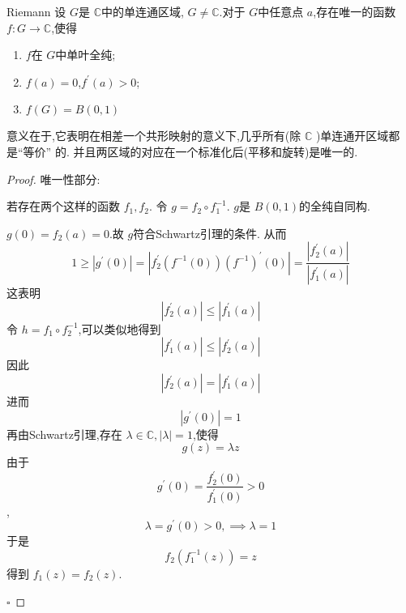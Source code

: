 \documentclass[../../复变函数.tex]{subfiles}
\begin{document}
\begin{theorem}{Riemann}
    设 \(  G  \)是 \(  \mathbb{C}   \)中的单连通区域, \(  G \neq \mathbb{C}   \).对于 \(  G  \)中任意点 \(  a  \),存在唯一的函数 \(  f:G\to \mathbb{C}   \),使得\begin{enumerate}
        \item \(  f  \)在 \(  G  \)中单叶全纯;
        \item  \(  f\left( a \right)= 0   \),\(  f^{\prime} \left( a \right)> 0   \);
        \item \(  f\left( G \right)= B\left( 0,1 \right)    \)     
    \end{enumerate}
          
\end{theorem}
\begin{note}
    意义在于,它表明在相差一个共形映射的意义下,几乎所有(除 \(  \mathbb{C}   \) )单连通开区域都是“等价” 的. 并且两区域的对应在一个标准化后(平移和旋转)是唯一的.
\end{note}
\begin{proof}
    唯一性部分:

    若存在两个这样的函数 \(  f_1,f_2  \). 令 \(  g = f_2\circ f_1^{-1}   \). \(  g  \)是 \(  B\left( 0,1 \right)   \)的全纯自同构.  

    \(  g\left( 0 \right)= f_2\left( a \right)= 0    \).故 \(  g  \)符合Schwartz引理的条件. 从而 \[
    1\ge \left| g^{\prime} \left( 0 \right)  \right|= \left| f_2^{\prime} \left( f^{-1} \left( 0 \right)  \right)\left( f^{-1}  \right)^{\prime} \left( 0 \right)    \right|= \frac{\left| f_2^{\prime} \left( a \right)  \right|  }{\left| f_1^{\prime} \left( a \right)  \right|  }   
    \]  这表明 \[
    \left| f_2^{\prime} \left( a \right)  \right|\le \left| f_1^{\prime} \left( a \right)  \right|  
    \]令 \(  h= f_1\circ f_2^{-1}   \),可以类似地得到 \[
    \left| f_1^{\prime} \left( a \right)  \right|\le \left| f_2^{\prime} \left( a \right)  \right|  
    \] 因此 \[
    \left| f_2^{\prime} \left( a \right)  \right|= \left| f_1^{\prime} \left( a \right)  \right|  
    \]进而 \[
    \left| g^{\prime} \left( 0 \right)  \right|= 1 
    \]再由Schwartz引理,存在 \(   \lambda \in \mathbb{C} ,\left|  \lambda  \right|= 1   \),使得 \[
    g\left( z \right)=  \lambda z 
    \]由于 \[
    g^{\prime} \left( 0 \right)= \frac{f_2^{\prime} \left( 0 \right)  }{f_1^{\prime} \left( 0 \right)  }> 0  
    \] , \[
     \lambda = g^{\prime} \left( 0 \right)> 0,\implies  \lambda = 1 
    \]于是\[
    f_2\left( f_1^{-1} \left( z \right)  \right)=   z 
    \] 得到 \(  f_1\left( z \right)= f_2\left( z \right)    \). 


    \hfill $\square$
\end{proof}
\end{document}
